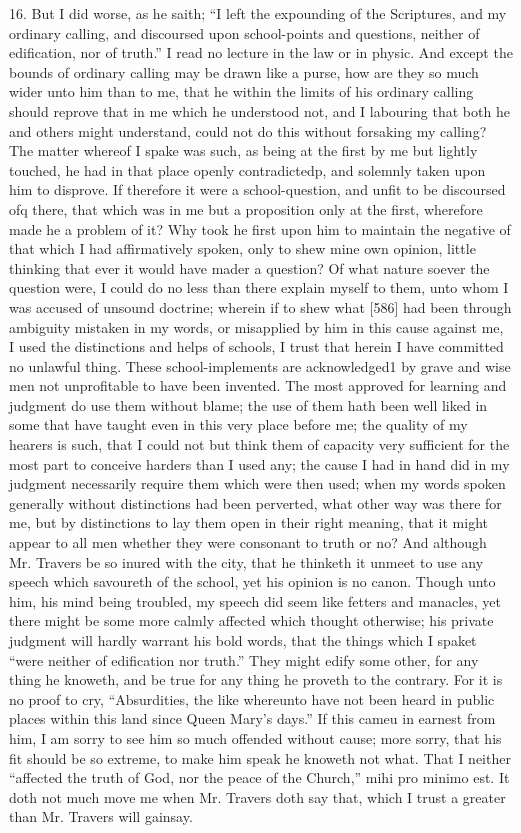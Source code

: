 16. But I did worse, as he saith; “I left the expounding of the Scriptures, and my ordinary calling, and discoursed upon school-points and questions, neither of edification, nor of truth.” I read no lecture in the law or in physic. And except the bounds of ordinary calling may be drawn like a purse, how are they so much wider unto him than to me, that he within the limits of his ordinary calling should reprove that in me which he understood not, and I labouring that both he and others might understand, could not do this without forsaking my calling? The matter whereof I spake was such, as being at the first by me but lightly touched, he had in that place openly contradictedp, and solemnly taken upon him to disprove. If therefore it were a school-question, and unfit to be discoursed ofq there, that which was in me but a proposition only at the first, wherefore made he a problem of it? Why took he first upon him to maintain the negative of that which I had affirmatively spoken, only to shew mine own opinion, little thinking that ever it would have mader a question? Of what nature soever the question were, I could do no less than there explain myself to them, unto whom I was accused of unsound doctrine; wherein if to shew what [586] had been through ambiguity mistaken in my words, or misapplied by him in this cause against me, I used the distinctions and helps of schools, I trust that herein I have committed no unlawful thing. These school-implements are acknowledged1 by grave and wise men not unprofitable to have been invented. The most approved for learning and judgment do use them without blame; the use of them hath been well liked in some that have taught even in this very place before me; the quality of my hearers is such, that I could not but think them of capacity very sufficient for the most part to conceive harders than I used any; the cause I had in hand did in my judgment necessarily require them which were then used; when my words spoken generally without distinctions had been perverted, what other way was there for me, but by distinctions to lay them open in their right meaning, that it might appear to all men whether they were consonant to truth or no? And although Mr. Travers be so inured with the city, that he thinketh it unmeet to use any speech which savoureth of the school, yet his opinion is no canon. Though unto him, his mind being troubled, my speech did seem like fetters and manacles, yet there might be some more calmly affected which thought otherwise; his private judgment will hardly warrant his bold words, that the things which I spaket “were neither of edification nor truth.” They might edify some other, for any thing he knoweth, and be true for any thing he proveth to the contrary. For it is no proof to cry, “Absurdities, the like whereunto have not been heard in public places within this land since Queen Mary’s days.” If this cameu in earnest from him, I am sorry to see him so much offended without cause; more sorry, that his fit should be so extreme, to make him speak he knoweth not what. That I neither “affected the truth of God, nor the peace of the Church,” mihi pro minimo est. It doth not much move me when Mr. Travers doth say that, which I trust a greater than Mr. Travers will gainsay.

